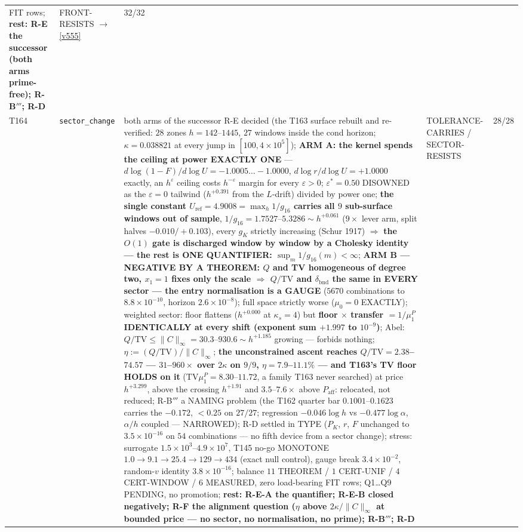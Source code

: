 \documentclass[11pt,a4paper]{article}
\begin{document}
{\begin{xltabular}{\linewidth}{@{}p{0.95cm} >{\raggedright\arraybackslash}p{3.1cm} Y >{\raggedright\scriptsize\arraybackslash}p{3.35cm} p{1.15cm}@{}}
FIT rows; \textbf{rest: R-E the successor (both arms prime-free); R-B$'''$; R-D} & FRONT-RESISTS $\to$ \vref{v555} & 32/32\\
T164 & \texttt{\scriptsize sector\_\allowbreak change} & both arms of the successor R-E decided (the T163 surface rebuilt and re-verified: $28$ zones $h=142$--$1445$, $27$ windows inside the cond horizon; $\kappa=0.038821$ at every jump in $[100,4\times10^{5}]$); \textbf{ARM A: the kernel spends the ceiling at power EXACTLY ONE} --- $d\log(1-F)/d\log U=-1.0005\ldots-1.0000$, $d\log r/d\log U=+1.0000$ exactly, an $h^{\varepsilon}$ ceiling costs $h^{-\varepsilon}$ margin for every $\varepsilon>0$; $\varepsilon^*=0.50$ DISOWNED as the $\varepsilon=0$ tailwind ($h^{+0.391}$ from the $L$-drift) divided by power one; \textbf{the single constant $U_{\mathrm{ref}}=4.9008=\max_h1/g_{16}$ carries all $9$ sub-surface windows out of sample}, $1/g_{16}=1.7527$--$5.3286\sim h^{+0.061}$ ($9\times$ lever arm, split halves $-0.010/+0.103$), every $g_K$ strictly increasing (Schur 1917) $\Rightarrow$ \textbf{the $O(1)$ gate is discharged window by window by a Cholesky identity --- the rest is ONE QUANTIFIER: $\sup_m1/g_{16}(m)<\infty$}; \textbf{ARM B --- NEGATIVE BY A THEOREM: $Q$ and TV homogeneous of degree two, $x_1=1$ fixes only the scale $\Rightarrow$ $Q/\mathrm{TV}$ and $\delta_{\mathrm{bnd}}$ the same in EVERY sector --- the entry normalisation is a GAUGE} ($5670$ combinations to $8.8\times10^{-10}$, horizon $2.6\times10^{-8}$); full space strictly worse ($\mu_0=0$ EXACTLY); weighted sector: floor flattens ($h^{+0.000}$ at $\kappa_s=4$) but \textbf{floor $\times$ transfer $=1/\mu^P_1$ IDENTICALLY at every shift (exponent sum $+1.997$ to $10^{-9}$)}; Abel: $Q/\mathrm{TV}\le\|C\|_\infty=30.3$--$930.6\sim h^{+1.185}$ growing --- forbids nothing; $\eta:=(Q/\mathrm{TV})/\|C\|_\infty$; \textbf{the unconstrained ascent reaches $Q/\mathrm{TV}=2.38$--$74.57$ --- $31$--$960\times$ over $2\kappa$ on $9/9$, $\eta=7.9$--$11.1\%$ --- and T163's TV floor HOLDS on it} ($\mathrm{TV}\mu^P_1=8.30$--$11.72$, a family T163 never searched) at price $h^{+3.299}$, above the crossing $h^{+1.91}$ and $3.5$--$7.6\times$ above $P_{\mathrm{aff}}$: relocated, not reduced; R-B$'''$ a NAMING problem (the T162 quarter bar $0.1001$--$0.1623$ carries the $-0.172$, $<0.25$ on $27/27$; regression $-0.046\log h$ vs $-0.477\log\alpha$, $\alpha/h$ coupled --- NARROWED); R-D settled in TYPE ($P_K$, $r$, $F$ unchanged to $3.5\times10^{-16}$ on $54$ combinations --- no fifth device from a sector change); stress: surrogate $1.5\times10^{3}$--$4.9\times10^{7}$, T145 no-go MONOTONE $1.0\to9.1\to25.4\to129\to434$ (exact null control), gauge break $3.4\times10^{-2}$, random-$v$ identity $3.8\times10^{-16}$; balance $11$ THEOREM / $1$ CERT-UNIF / $4$ CERT-WINDOW / $6$ MEASURED, zero load-bearing FIT rows; Q1\ldots Q9 PENDING, no promotion; \textbf{rest: R-E-A the quantifier; R-E-B closed negatively; R-F the alignment question ($\eta$ above $2\kappa/\|C\|_\infty$ at bounded price --- no sector, no normalisation, no prime); R-B$'''$; R-D} & TOLERANCE-CARRIES / SECTOR-RESISTS & 28/28\\

\end{xltabular}}
\end{document}
